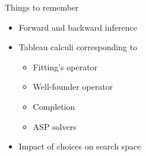 \begin{frame}{Things to remember}
  \bigskip
  \begin{itemize}
  \item Forward and backward inference
    \smallskip
  \item Tableau calculi corresponding to
    \begin{itemize}\normalsize
    \item Fitting's operator
    \item Well-founder operator
    \item Completion
    \item ASP solvers
    \end{itemize}
    \smallskip
  \item Impact of choices on search space
  \end{itemize}
\end{frame}
%
